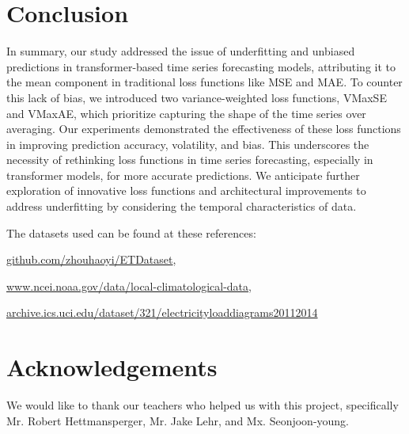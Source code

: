 \documentclass{article}
\begin{document}
\section{Conclusion}

In summary, our study addressed the issue of underfitting and unbiased predictions in transformer-based time series forecasting models, attributing it to the mean component in traditional loss functions like MSE and MAE. To counter this lack of bias, we introduced two variance-weighted loss functions, VMaxSE and VMaxAE, which prioritize capturing the shape of the time series over averaging. Our experiments demonstrated the effectiveness of these loss functions in improving prediction accuracy, volatility, and bias. This underscores the necessity of rethinking loss functions in time series forecasting, especially in transformer models, for more accurate predictions. We anticipate further exploration of innovative loss functions and architectural improvements to address underfitting by considering the temporal characteristics of data.

The datasets used can be found at these references:

\href{https://github.com/zhouhaoyi/ETDataset}{github.com/zhouhaoyi/ETDataset},

\href{https://www.ncei.noaa.gov/data/local-climatological-data}{www.ncei.noaa.gov/data/local-climatological-data},

\href{https://archive.ics.uci.edu/dataset/321/electricityloaddiagrams20112014}{archive.ics.uci.edu/dataset/321/electricityloaddiagrams20112014}

\section{Acknowledgements}

We would like to thank our teachers who helped us with this project, specifically Mr. Robert Hettmansperger, Mr. Jake Lehr, and Mx. Seonjoon-young.

\printbibliography
\end{document}
